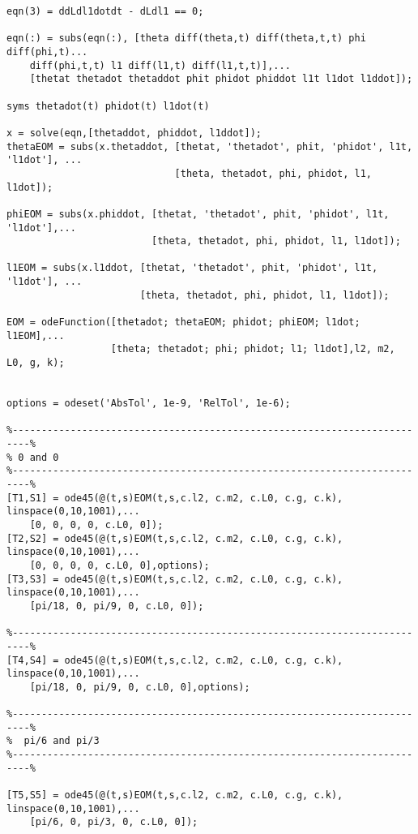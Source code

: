 \begin{lstlisting}[frame=lines,style=Matlab-editor,basicstyle = \mlttfamily]
% l (spring) EOM
eqn(3) = ddLdl1dotdt - dLdl1 == 0;

eqn(:) = subs(eqn(:), [theta diff(theta,t) diff(theta,t,t) phi diff(phi,t)...
    diff(phi,t,t) l1 diff(l1,t) diff(l1,t,t)],...
    [thetat thetadot thetaddot phit phidot phiddot l1t l1dot l1ddot]);

syms thetadot(t) phidot(t) l1dot(t)

x = solve(eqn,[thetaddot, phiddot, l1ddot]);
thetaEOM = subs(x.thetaddot, [thetat, 'thetadot', phit, 'phidot', l1t, 'l1dot'], ...
                             [theta, thetadot, phi, phidot, l1, l1dot]);

phiEOM = subs(x.phiddot, [thetat, 'thetadot', phit, 'phidot', l1t, 'l1dot'],...
                         [theta, thetadot, phi, phidot, l1, l1dot]);

l1EOM = subs(x.l1ddot, [thetat, 'thetadot', phit, 'phidot', l1t, 'l1dot'], ...
                       [theta, thetadot, phi, phidot, l1, l1dot]);

EOM = odeFunction([thetadot; thetaEOM; phidot; phiEOM; l1dot; l1EOM],...
                  [theta; thetadot; phi; phidot; l1; l1dot],l2, m2, L0, g, k);


options = odeset('AbsTol', 1e-9, 'RelTol', 1e-6);

%-------------------------------------------------------------------------%
% 0 and 0
%-------------------------------------------------------------------------%
[T1,S1] = ode45(@(t,s)EOM(t,s,c.l2, c.m2, c.L0, c.g, c.k), linspace(0,10,1001),...
    [0, 0, 0, 0, c.L0, 0]);
[T2,S2] = ode45(@(t,s)EOM(t,s,c.l2, c.m2, c.L0, c.g, c.k), linspace(0,10,1001),...
    [0, 0, 0, 0, c.L0, 0],options);
[T3,S3] = ode45(@(t,s)EOM(t,s,c.l2, c.m2, c.L0, c.g, c.k), linspace(0,10,1001),...
    [pi/18, 0, pi/9, 0, c.L0, 0]);

%-------------------------------------------------------------------------%
[T4,S4] = ode45(@(t,s)EOM(t,s,c.l2, c.m2, c.L0, c.g, c.k), linspace(0,10,1001),...
    [pi/18, 0, pi/9, 0, c.L0, 0],options);

%-------------------------------------------------------------------------%
%  pi/6 and pi/3
%-------------------------------------------------------------------------%

[T5,S5] = ode45(@(t,s)EOM(t,s,c.l2, c.m2, c.L0, c.g, c.k), linspace(0,10,1001),...
    [pi/6, 0, pi/3, 0, c.L0, 0]);


\end{lstlisting}

